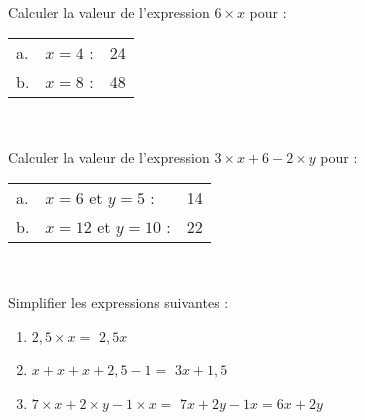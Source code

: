 \documentclass[a4paper,12pt,landscape,twocolumn]{article}
\newcommand{\correction}[1]{{\color{red}#1}}
\begin{document}
{	\begin{exercice}\

		Calculer la valeur de l'expression $6 × x$ pour : \vspace{0.5em}

		\begin{tabular}{llm{4cm}}
			a. & $x = 4$ : & \correction{24} \\
			b. & $x = 8$ : & \correction{48} \\
		\end{tabular}
	\end{exercice}

	\begin{exercice}\

		Calculer la valeur de l'expression $3 × x + 6 - 2 × y$ pour : \vspace{0.5em}

		\begin{tabular}{llm{4cm}}
			a. & $x = 6$ et $y = 5$ :   & \correction{14} \\ 
			b. & $x = 12$ et $y = 10$ : & \correction{22} \\
		\end{tabular}
	\end{exercice}

	\begin{exercice}\

		Simplifier les expressions suivantes : \vspace{0.5em}
		\begin{enumerate}[label=\alph*.]
			\setlength\itemsep{5pt}
			\item $2{,}5 × x = $ \correction{$2{,}5x$}
			\item $x + x + x + 2{,}5 - 1 = $ \correction{$3x + 1{,}5$}
			\item $7 × x + 2 × y  - 1 × x = $ \correction{$7x + 2y - 1x = 6x + 2y$}
		\end{enumerate}
	\end{exercice}
}

\newpage

\setcounter{exercice}{0}
\end{document}
